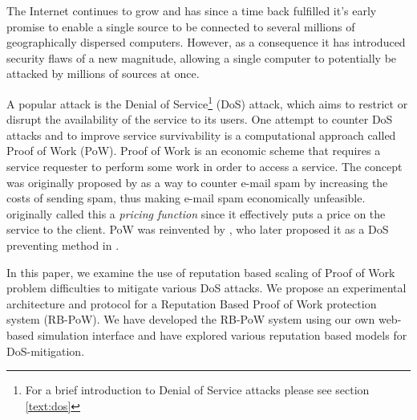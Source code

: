 The Internet continues to grow and has since a time back fulfilled it's early promise to enable a single source to be connected to several millions of geographically dispersed computers. However, as a consequence it has introduced security flaws of a new magnitude, allowing a single computer to potentially be attacked by millions of sources at once.

A popular attack is the Denial of Service\footnote{For a brief introduction to Denial of Service attacks please see section \ref{text:dos}} (DoS) attack, which aims to restrict or disrupt the availability of the service to its users.
One attempt to counter DoS attacks and to improve service survivability is a computational approach called Proof of Work (PoW).
Proof of Work is an economic scheme that requires a service requester to perform some work in order to access a service.
The concept was originally proposed by \citeauthor{DworkN92}\cite{DworkN92} as a way to counter e-mail spam by increasing the costs of sending spam, thus making e-mail spam economically unfeasible.
\citeauthor{DworkN92} originally called this a \emph{pricing function} since it effectively puts a price on the service to the client.
PoW was reinvented by \citeauthor{Back02}, who later proposed it as a DoS preventing method in . 

In this paper, we examine the use of reputation based scaling of Proof of Work problem difficulties to mitigate various DoS attacks. We propose an experimental architecture and protocol for a Reputation Based Proof of Work protection system (RB-PoW). We have developed the RB-PoW system using our own web-based simulation interface and have explored various reputation based models for DoS-mitigation.

 




